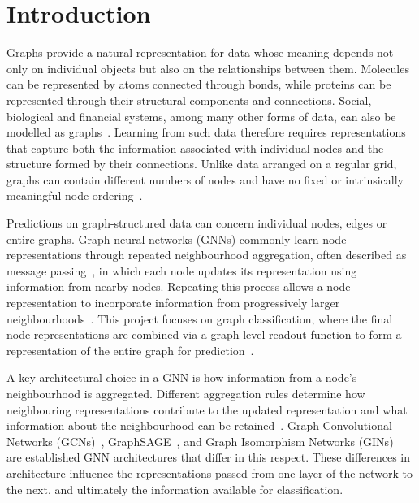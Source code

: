 \documentclass[11pt,a4paper]{article}
\begin{document}
\clearpage
\begingroup
\setlength{\parskip}{0pt}
\setlength{\cftbeforesecskip}{5pt}
\setlength{\cftbeforesubsecskip}{1pt}
\setlength{\cftbeforesubsubsecskip}{0.5pt}
\setlength{\cftsecnumwidth}{2em}
\setlength{\cftsubsecindent}{2em}
\setlength{\cftsubsecnumwidth}{2.6em}
\setlength{\cftsubsubsecindent}{4.6em}
\setlength{\cftsubsubsecnumwidth}{3.2em}
\tableofcontents
\endgroup
\clearpage






\clearpage
\section{Introduction}

Graphs provide a natural representation for data whose meaning depends not only on individual objects but also on the relationships between them. Molecules can be represented by atoms connected through bonds, while proteins can be represented through their structural components and connections. Social, biological and financial systems, among many other forms of data, can also be modelled as graphs~\cite{xu2019powerful}. Learning from such data therefore requires representations that capture both the information associated with individual nodes and the structure formed by their connections. Unlike data arranged on a regular grid, graphs can contain different numbers of nodes and have no fixed or intrinsically meaningful node ordering~\cite{hamilton2017inductive}.

Predictions on graph-structured data can concern individual nodes, edges or entire graphs. Graph neural networks (GNNs) commonly learn node representations through repeated neighbourhood aggregation, often described as message passing~\cite{gilmer2017neural}, in which each node updates its representation using information from nearby nodes. Repeating this process allows a node representation to incorporate information from progressively larger neighbourhoods~\cite{xu2019powerful}. This project focuses on graph classification, where the final node representations are combined via a graph-level readout function to form a representation of the entire graph for prediction~\cite{gilmer2017neural}.

A key architectural choice in a GNN is how information from a node's neighbourhood is aggregated. Different aggregation rules determine how neighbouring representations contribute to the updated representation and what information about the neighbourhood can be retained~\cite{xu2019powerful}. Graph Convolutional Networks (GCNs)~\cite{kipf2017gcn}, GraphSAGE~\cite{hamilton2017inductive}, and Graph Isomorphism Networks (GINs)~\cite{xu2019powerful} are established GNN architectures that differ in this respect. These differences in architecture influence the representations passed from one layer of the network to the next, and ultimately the information available for classification.
\end{document}
